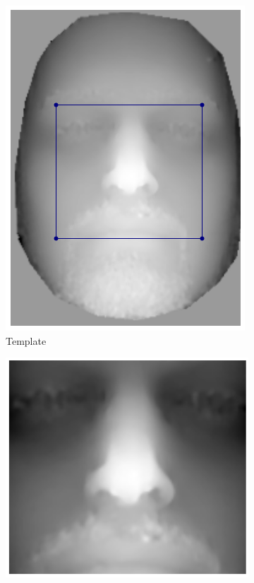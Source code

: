 \begin{figure}[t]
    \centering
    \hspace*{\fill}
    \begin{subfigure}[b]{0.2\textwidth}
    	\includegraphics[width=\textwidth]{statistical_normals/images/lk2d/bs004_template.png}
    	\caption{Template}\label{subfig:singl_img_depth_2d_lk_template}
    \end{subfigure} \hfill
    \begin{subfigure}[b]{0.2\textwidth}
    	\includegraphics[width=\textwidth]{statistical_normals/images/lk2d/bs004_template_cropped.png}

\end{subfigure}
\end{figure}
